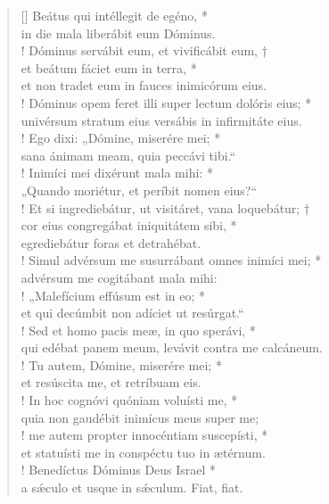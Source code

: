 \begin{verse}[\versewidth]
Beátus qui intéllegit de egéno, *\\
in die mala liberábit eum Dóminus.\\!
\vin Dóminus servábit eum, et vivificábit eum, †\\
\vin et beátum fáciet eum in terra, *\\
\vin et non tradet eum in fauces inimicórum eius.\\!
Dóminus opem feret illi super lectum dolóris eius; *\\
univérsum stratum eius versábis in infirmitáte eius.\\!
\vin Ego dixi: „Dómine, miserére mei; *\\
\vin sana ánimam meam, quia peccávi tibi.“\\!
Inimíci mei dixérunt mala mihi: *\\
„Quando moriétur, et períbit nomen eius?“\\!
\vin Et si ingrediebátur, ut visitáret, vana loquebátur; †\\
\vin cor eius congregábat iniquitátem sibi, *\\
\vin egrediebátur foras et detrahébat.\\!
Simul advérsum me susurrábant omnes inimíci mei; *\\
advérsum me cogitábant mala mihi:\\!
\vin „Malefícium effúsum est in eo; *\\
\vin et qui decúmbit non adíciet ut resúrgat.“\\!
Sed et homo pacis meæ, in quo sperávi, *\\
qui edébat panem meum, levávit contra me calcáneum.\\!
\vin Tu autem, Dómine, miserére mei; *\\
\vin et resúscita me, et retríbuam eis.\\!
In hoc cognóvi quóniam voluísti me, *\\
quia non gaudébit inimícus meus super me;\\!
\vin me autem propter innocéntiam suscepísti, *\\
\vin et statuísti me in conspéctu tuo in ætérnum.\\!
Benedíctus Dóminus Deus Israel *\\
a s\'{æ}culo et usque in s\'{æ}culum. Fiat, fiat.\\
\end{verse}
\vspace{1cm}



